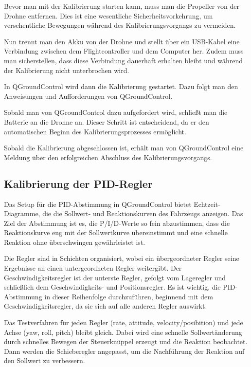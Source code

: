 Bevor man mit der Kalibrierung starten kann, muss man die Propeller von der Drohne entfernen. Dies ist eine wesentliche Sicherheitsvorkehrung, um versehentliche Bewegungen während des Kalibrierungsvorgangs zu vermeiden.

Nun trennt man den Akku von der Drohne und stellt über ein USB-Kabel eine Verbindung zwischen dem Flightcontroller und dem Computer her. Zudem muss man sicherstellen, dass diese Verbindung dauerhaft erhalten bleibt und während der Kalibrierung nicht unterbrochen wird.

In QGroundControl wird dann die Kalibrierung gestartet. Dazu folgt man den Anweisungen und Aufforderungen von QGroundControl.

Sobald man von QGroundControl dazu aufgefordert wird, schließt man die Batterie an die Drohne an. Dieser Schritt ist entscheidend, da er den automatischen Beginn des Kalibrierungsprozesses ermöglicht.

Sobald die Kalibrierung abgeschlossen ist, erhält man von QGroundControl eine Meldung über den erfolgreichen Abschluss des Kalibrierungsvorgangs.

\subsection{Kalibrierung der PID-Regler}
Das Setup für die PID-Abstimmung in QGroundControl bietet Echtzeit-Diagramme, die die Sollwert- und Reaktionskurven des Fahrzeugs anzeigen. Das Ziel der Abstimmung ist es, die P/I/D-Werte so fein abzustimmen, dass die Reaktionskurve eng mit der Sollwertkurve übereinstimmt und eine schnelle Reaktion ohne überschwingen gewährleistet ist.

Die Regler sind in Schichten organisiert, wobei ein übergeordneter Regler seine Ergebnisse an einen untergeordneten Regler weitergibt. Der Geschwindigkeitsregler ist der unterste Regler, gefolgt vom Lageregler und schließlich dem Geschwindigkeits- und Positionsregler. Es ist wichtig, die PID-Abstimmung in dieser Reihenfolge durchzuführen, beginnend mit dem Geschwindigkeitsregler, da sie sich auf alle anderen Regler auswirkt.

Das Testverfahren für jeden Regler (rate, attitude, velocity/posibition) und jede Achse (yaw, roll, pitch) bleibt gleich. Dabei wird eine schnelle Sollwertänderung durch schnelles Bewegen der Steuerknüppel erzeugt und die Reaktion beobachtet. Dann werden die Schieberegler angepasst, um die Nachführung der Reaktion auf den Sollwert zu verbessern.

